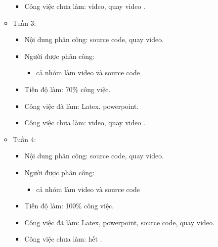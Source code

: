 \documentclass{article}
\begin{document}
\begin{itemize}
\begin{itemize}
\begin{itemize}
                    \item Công việc chưa làm: video, quay video .
                \end{itemize}
            \item Tuần 3:
               \begin{itemize}
                    \item Nội dung phân công: source code, quay video.
                    \item Người được phân công:
                        \begin{itemize}
                            \item cả nhóm làm video và source code
                        \end{itemize}
                    \item Tiến độ làm: 70\% công việc.
                    \item Công việc đã làm: Latex, powerpoint.
                    \item Công việc chưa làm: video, quay video .
                \end{itemize}
            \item Tuần 4:
                \begin{itemize}
                    \item Nội dung phân công: source code, quay video.
                    \item Người được phân công:
                        \begin{itemize}
                            \item cả nhóm làm video và source code
                        \end{itemize}
                    \item Tiến độ làm: 100\% công việc.
                    \item Công việc đã làm: Latex, powerpoint, source code, quay video.
                    \item Công việc chưa làm: hết .
                \end{itemize}
        \end{itemize}
        
\end{itemize}
\end{document}
